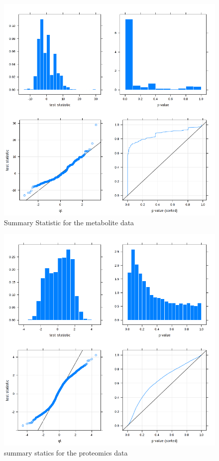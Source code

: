 \documentclass[a4paper]{book}
\begin{document}
\begin{subappendices}
\begin{figure}[ht]
	\includegraphics[width=0.8\linewidth]{Appendix_FIgures/metabotes.png}
	\caption{Summary Statistic for the metabolite data}
\end{figure}
\clearpage

\begin{figure}[ht]
	\includegraphics[width=0.8\linewidth]{Appendix_FIgures/power_stat_3_dpi72.png}
	\caption{summary statics for the proteomics data}
\end{figure}
\clearpage


\end{subappendices}
\end{document}
